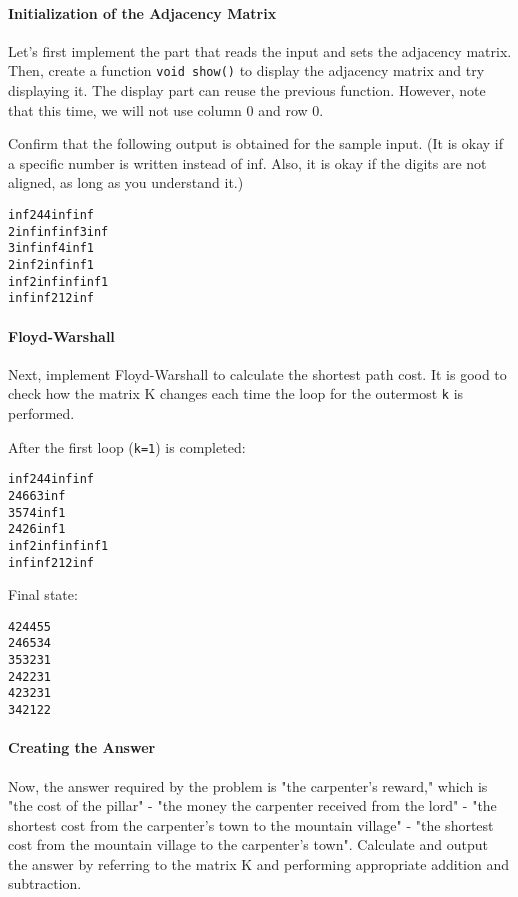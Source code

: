 \paragraph{Initialization of the Adjacency Matrix}

Let's first implement the part that reads the input and sets the adjacency matrix.
Then, create a function \texttt{void show()} to display the adjacency matrix and try displaying it. The display part can reuse the previous function. However, note that this time, we will not use column 0 and row 0.

Confirm that the following output is obtained for the sample input. (It is okay if a specific number is written instead of inf. Also, it is okay if the digits are not aligned, as long as you understand it.)

\begin{alltt}
  inf    2    4    4  inf  inf
    2  inf  inf  inf    3  inf
    3  inf  inf    4  inf    1
    2  inf    2  inf  inf    1
  inf    2  inf  inf  inf    1
  inf  inf    2    1    2  inf
\end{alltt}

\paragraph{Floyd-Warshall}

Next, implement Floyd-Warshall to calculate the shortest path cost.
It is good to check how the matrix K changes each time the loop for the outermost \texttt{k} is performed.

After the first loop (\texttt{k=1}) is completed:
\begin{alltt}
  inf    2    4    4  inf  inf
    2    4    6    6    3  inf
    3    5    7    4  inf    1
    2    4    2    6  inf    1
  inf    2  inf  inf  inf    1
  inf  inf    2    1    2  inf
\end{alltt}

Final state:
\begin{alltt}
    4    2    4    4    5    5
    2    4    6    5    3    4
    3    5    3    2    3    1
    2    4    2    2    3    1
    4    2    3    2    3    1
    3    4    2    1    2    2
\end{alltt}

\paragraph{Creating the Answer}

Now, the answer required by the problem is
"the carpenter's reward," which is
"the cost of the pillar" - "the money the carpenter received from the lord" - "the shortest cost from the carpenter's town to the mountain village" - "the shortest cost from the mountain village to the carpenter's town".
Calculate and output the answer by referring to the matrix K and performing appropriate addition and subtraction.

